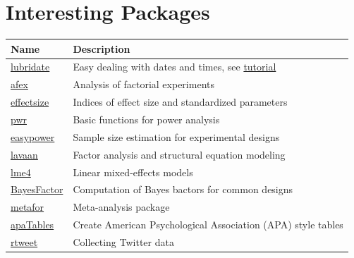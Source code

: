 \documentclass[
]{scrartcl}
\begin{document}
\section{Interesting Packages}\label{packagelist}

\begin{longtable}[]{@{}
  >{\raggedright\arraybackslash}p{}
  >{\raggedright\arraybackslash}p{}@{}}
\toprule\noalign{}
\begin{minipage}[b]{\linewidth}\raggedright
Name
\end{minipage} & \begin{minipage}[b]{\linewidth}\raggedright
Description
\end{minipage} \\
\midrule\noalign{}
\endhead
\bottomrule\noalign{}
\endlastfoot
\href{http://lubridate.tidyverse.org/}{lubridate} & Easy dealing with dates and times, see \href{https://r4ds.had.co.nz/dates-and-times.html}{tutorial} \\
\href{https://cran.r-project.org/web/packages/afex/}{afex} & Analysis of factorial experiments \\
\href{https://easystats.github.io/effectsize/}{effectsize} & Indices of effect size and standardized parameters \\
\href{https://cran.r-project.org/web/packages/pwr/}{pwr} & Basic functions for power analysis \\
\href{https://cran.r-project.org/web/packages/easypower}{easypower} & Sample size estimation for experimental designs \\
\href{https://www.lavaan.ugent.be/}{lavaan} & Factor analysis and structural equation modeling \\
\href{https://cran.r-project.org/web/packages/lme4/index.html}{lme4} & Linear mixed-effects models \\
\href{https://richarddmorey.github.io/BayesFactor/}{BayesFactor} & Computation of Bayes bactors for common designs \\
\href{http://www.metafor-project.org/}{metafor} & Meta-analysis package \\
\href{https://cran.r-project.org/web/packages/apaTables/index.html}{apaTables} & Create American Psychological Association (APA) style tables \\
\href{https://cran.r-project.org/web/packages/rtweet/index.html}{rtweet} & Collecting Twitter data \\
\end{longtable}
\end{document}
